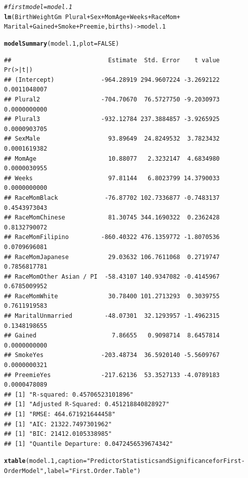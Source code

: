 \documentclass{article}\usepackage[]{graphicx}\usepackage[]{xcolor}
\makeatletter
\newcommand{\hlnum}[1]{\textcolor[rgb]{0.686,0.059,0.569}{#1}}%
\newcommand{\hlstr}[1]{\textcolor[rgb]{0.192,0.494,0.8}{#1}}%
\newcommand{\hlcom}[1]{\textcolor[rgb]{0.678,0.584,0.686}{\textit{#1}}}%
\newcommand{\hlopt}[1]{\textcolor[rgb]{0,0,0}{#1}}%
\newcommand{\hlstd}[1]{\textcolor[rgb]{0.345,0.345,0.345}{#1}}%
\newcommand{\hlkwb}[1]{\textcolor[rgb]{0.69,0.353,0.396}{#1}}%
\newcommand{\hlkwc}[1]{\textcolor[rgb]{0.333,0.667,0.333}{#1}}%
\newcommand{\hlkwd}[1]{\textcolor[rgb]{0.737,0.353,0.396}{\textbf{#1}}}%
\newenvironment{kframe}{%
 \def\at@end@of@kframe{}%
 \ifinner\ifhmode%
  \def\at@end@of@kframe{\end{minipage}}%
  \begin{minipage}{\columnwidth}%
 \fi\fi%
 \def\FrameCommand##1{\hskip\@totalleftmargin \hskip-\fboxsep
 \colorbox{shadecolor}{##1}\hskip-\fboxsep
     \hskip-\linewidth \hskip-\@totalleftmargin \hskip\columnwidth}%
 \MakeFramed {\advance\hsize-\width
   \@totalleftmargin\z@ \linewidth\hsize
   \@setminipage}}%
 {\par\unskip\endMakeFramed%
 \at@end@of@kframe}
\newenvironment{knitrout}{}{} %
\makeatother
\begin{document}
  
\begin{knitrout}
\color{fgcolor}\begin{kframe}
\begin{alltt}
\hlcom{#first model = model.1}
\hlkwd{lm}\hlstd{(BirthWeightGm} \hlopt{~} \hlstd{Plural} \hlopt{+} \hlstd{Sex} \hlopt{+} \hlstd{MomAge} \hlopt{+} \hlstd{Weeks} \hlopt{+} \hlstd{RaceMom} \hlopt{+}
     \hlstd{Marital} \hlopt{+} \hlstd{Gained} \hlopt{+} \hlstd{Smoke} \hlopt{+} \hlstd{Preemie, births)} \hlkwb{->} \hlstd{model.1}

\hlkwd{modelSummary}\hlstd{(model.1,} \hlkwc{plot}\hlstd{=}\hlnum{FALSE}\hlstd{)}
\end{alltt}
\begin{verbatim}
##                           Estimate  Std. Error    t value     Pr(>|t|)
## (Intercept)             -964.28919 294.9607224 -3.2692122 0.0011048007
## Plural2                 -704.70670  76.5727750 -9.2030973 0.0000000000
## Plural3                 -932.12784 237.3884857 -3.9265925 0.0000903705
## SexMale                   93.89649  24.8249532  3.7823432 0.0001619382
## MomAge                    10.88077   2.3232147  4.6834980 0.0000030955
## Weeks                     97.81144   6.8023799 14.3790033 0.0000000000
## RaceMomBlack             -76.87702 102.7336877 -0.7483137 0.4543973043
## RaceMomChinese            81.30745 344.1690322  0.2362428 0.8132790072
## RaceMomFilipino         -860.40322 476.1359772 -1.8070536 0.0709696081
## RaceMomJapanese           29.03632 106.7611068  0.2719747 0.7856817781
## RaceMomOther Asian / PI  -58.43107 140.9347082 -0.4145967 0.6785009952
## RaceMomWhite              30.78400 101.2713293  0.3039755 0.7611919583
## MaritalUnmarried         -48.07301  32.1293957 -1.4962315 0.1348198655
## Gained                     7.86655   0.9098714  8.6457814 0.0000000000
## SmokeYes                -203.48734  36.5920140 -5.5609767 0.0000000321
## PreemieYes              -217.62136  53.3527133 -4.0789183 0.0000478089
## [1] "R-squared: 0.45706523101896"
## [1] "Adjusted R-Squared: 0.451218840828927"
## [1] "RMSE: 464.671921644458"
## [1] "AIC: 21322.7497301962"
## [1] "BIC: 21412.0105338985"
## [1] "Quantile Departure: 0.0472456539674342"
\end{verbatim}
\end{kframe}
\end{knitrout}
  
\begin{knitrout}
\color{fgcolor}\begin{kframe}
\begin{alltt}
\hlkwd{xtable}\hlstd{(model.1,} \hlkwc{caption}\hlstd{=}\hlstr{"Predictor Statistics and Significance for First-Order Model"}\hlstd{,} \hlkwc{label}\hlstd{=}\hlstr{"First.Order.Table"}\hlstd{)}
\end{alltt}
\end{kframe}
\end{knitrout}
\end{document}
